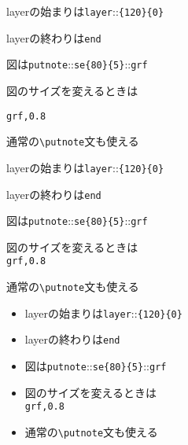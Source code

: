 \documentclass[landscape,10pt]{ujarticle}
\def\setthin#1{\def\thin{#1}}
\begin{document}
\sameslide

\vspace*{18mm}

\setthin{0}
\begin{itemize}
\item
layerの始まりは\verb+layer+{:}{:}\verb+{120}{0}+
\item
layerの終わりは\verb|end|
\item
図は\verb+putnote+{:}{:}\verb+se{80}{5}+{:}{:}\verb+grf+
{\color[cmyk]{\thin,\thin,\thin,\thin}
\item
図のサイズを変えるときは\\
}%
{\color[cmyk]{\thin,\thin,\thin,\thin}
\hspace*{10mm}{:}{:}\verb+grf,0.8+
}%
{\color[cmyk]{\thin,\thin,\thin,\thin}
\item
通常の\verb|\putnote|文も使える
}%
\end{itemize}

\sameslide

\vspace*{18mm}

\setthin{0}
\begin{itemize}
\item
layerの始まりは\verb+layer+{:}{:}\verb+{120}{0}+
\item
layerの終わりは\verb|end|
\item
図は\verb+putnote+{:}{:}\verb+se{80}{5}+{:}{:}\verb+grf+
\item
図のサイズを変えるときは\\
\hspace*{10mm}{:}{:}\verb+grf,0.8+
{\color[cmyk]{\thin,\thin,\thin,\thin}
\item
通常の\verb|\putnote|文も使える
}%
\end{itemize}

\sameslide

\vspace*{18mm}

\setthin{0}
\begin{itemize}
\item
layerの始まりは\verb+layer+{:}{:}\verb+{120}{0}+
\item
layerの終わりは\verb|end|
\item
図は\verb+putnote+{:}{:}\verb+se{80}{5}+{:}{:}\verb+grf+
\item
図のサイズを変えるときは\\
\hspace*{10mm}{:}{:}\verb+grf,0.8+
\item
通常の\verb|\putnote|文も使える
\end{itemize}
\end{document}
